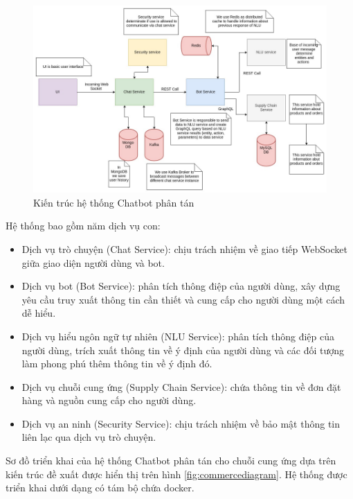 \begin{center}
    \begin{figure}[ht!]
        \begin{center}
         \includegraphics[scale=0.98]{chapter2/img/commerce.png}
        \end{center}
        \caption{Kiến trúc hệ thống Chatbot phân tán}
        \label{fig:commerce}
    \end{figure}
\end{center}

Hệ thống bao gồm năm dịch vụ con:
\begin{itemize}
    \item Dịch vụ trò chuyện (Chat Service): chịu trách nhiệm về giao tiếp WebSocket giữa giao diện người dùng và bot.
    \item Dịch vụ bot (Bot Service): phân tích thông điệp của người dùng, xây dựng yêu cầu truy xuất thông tin cần thiết và cung cấp cho người dùng một cách dễ hiểu.
    \item Dịch vụ hiểu ngôn ngữ tự nhiên (NLU Service): phân tích thông điệp của người dùng, trích xuất thông tin về ý định của người dùng và các đối tượng làm phong phú thêm thông tin về ý định đó.
    \item Dịch vụ chuỗi cung ứng (Supply Chain Service): chứa thông tin về đơn đặt hàng và nguồn cung cấp cho người dùng.
    \item Dịch vụ an ninh (Security Service): chịu trách nhiệm về bảo mật thông tin liên lạc qua dịch vụ trò chuyện.
\end{itemize}

Sơ đồ triển khai của hệ thống Chatbot phân tán cho chuỗi cung ứng dựa trên kiến trúc đề xuất được hiển thị trên hình \ref{fig:commercediagram}. Hệ thống được triển khai dưới dạng có tám bộ chứa docker.

